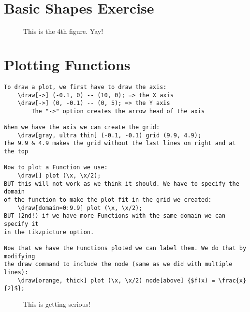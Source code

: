 \documentclass[12pt,titlepage]{article}
\begin{document}
\newpage
\section{Basic Shapes Exercise}

\begin{figure}[h]
    \centering
    \caption{This is the 4th figure. Yay!}
\end{figure}

\newpage
\section{Plotting Functions}

\begin{verbatim}
To draw a plot, we first have to draw the axis:
    \draw[->] (-0.1, 0) -- (10, 0); => the X axis
    \draw[->] (0, -0.1) -- (0, 5); => the Y axis
        The "->" option creates the arrow head of the axis

When we have the axis we can create the grid:
    \draw[gray, ultra thin] (-0.1, -0.1) grid (9.9, 4.9);
The 9.9 & 4.9 makes the grid without the last lines on right and at the top

Now to plot a Function we use:
    \draw[] plot (\x, \x/2);
BUT this will not work as we think it should. We have to specify the domain
of the function to make the plot fit in the grid we created:
    \draw[domain=0:9.9] plot (\x, \x/2);
BUT (2nd!) if we have more Functions with the same domain we can specify it
in the tikzpicture option.

Now that we have the Functions ploted we can label them. We do that by modifying
the draw command to include the node (same as we did with multiple lines):
    \draw[orange, thick] plot (\x, \x/2) node[above] {$f(x) = \frac{x}{2}$};
\end{verbatim}
\begin{figure}[h]
    \centering
    \caption{This is getting serious!}
\end{figure}
\end{document}
